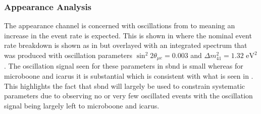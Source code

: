 \subsubsection{\texorpdfstring{\nue Appearance Analysis}{nue Appearance Analysis}}\label{sec:nue_app}

The \nue appearance channel is concerned with oscillations from \numu to \nue meaning an increase in the event rate is expected. This is shown in  where the nominal event rate breakdown is shown as in  but overlayed with an integrated spectrum that was produced with oscillation parameters \mbox{$\sin^2{2\theta_{\mu e}} = 0.003$} and $\Delta m^2_{41} = 1.32 \text{ eV}^2$. The oscillation signal seen for these parameters in \gls{sbnd} is small whereas for \gls{microboone} and \gls{icarus} it is substantial which is consistent with what is seen in . This highlights the fact that \gls{sbnd} will largely be used to constrain systematic parameters due to observing no or very few oscillated events with the oscillation signal being largely left to \gls{microboone} and \gls{icarus}. 


